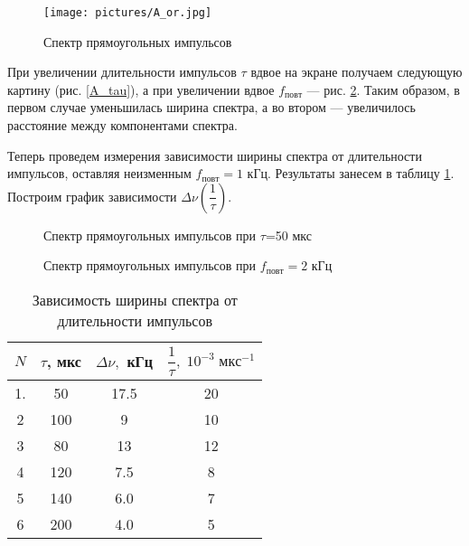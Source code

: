 \documentclass[a4paper, 14pt]{extarticle}%
\begin{document}
  \begin{figure}[h]
  	\centering
  	\texttt{[image: pictures/A\_or.jpg]}
  	\caption{Спектр прямоугольных импульсов}
  	\label{A_or}
  \end{figure}
  
  При увеличении длительности импульсов $ \tau $ вдвое на экране получаем следующую картину (рис. \ref{A_tau}), а при увеличении вдвое $ f_{повт} $ --- рис. \ref{A_f}. Таким образом, в первом случае уменьшилась ширина спектра, а во втором --- увеличилось расстояние между компонентами спектра.
  
  Теперь проведем измерения зависимости ширины спектра от длительности импульсов, оставляя неизменным $ f_{повт} = 1 $ кГц. Результаты занесем в таблицу \ref{A_table}. Построим график зависимости $ \Delta \nu \left (\dfrac{1} {\tau} \right ) $. 
  \begin{figure}[h!]
  	\begin{minipage}[h]{0.5\linewidth}
  		\caption{Спектр прямоугольных импульсов при $\tau$=50 мкс}
  		\label{A_tau}
  	\end{minipage}
  	\begin{minipage}[h]{0.5\linewidth}
  		\caption{Спектр прямоугольных импульсов при $f_{повт}=2$ кГц}
  		\label{A_f}
  	\end{minipage}
  \end{figure}
  	
  	\begin{table}[]
  		\caption{Зависимость ширины спектра от длительности импульсов}
  		\begin{center}
  			\begin{tabular}{|c|c|c|c|}
  			\hline
  			$ N $ & $ \tau $, мкс & $ \Delta\nu, $ кГц  & $ \dfrac{1}{\tau}, \; 10^{-3} \; мкс^{-1}$ \\
  			\hline
  			1. & 50 & 17.5 & 20 \\
  				\hline
  			2 & 100 & 9 & 10 \\
  				\hline
  			3 & 80 & 13 & 12 \\
  				\hline
  			4 & 120 & 7.5 & 8 \\
  				\hline
  			5 & 140 & 6.0 & 7 \\
  				\hline
  			6 & 200 & 4.0 & 5 \\
  				\hline
  			\end{tabular}
  		\end{center}
  	\label{A_table}
  	\end{table}
  	
\end{document}
